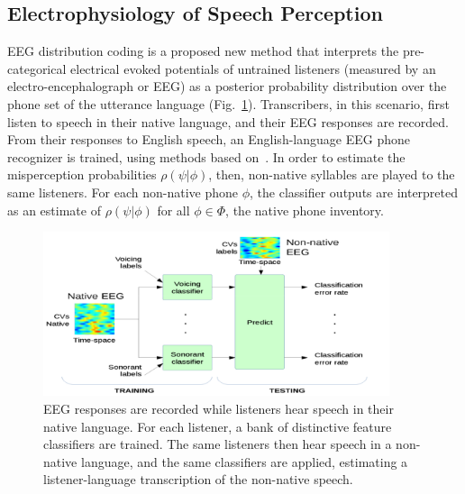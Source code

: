 \subsection{Electrophysiology of Speech Perception}
  
EEG distribution coding is a proposed new method that interprets the
pre-categorical electrical evoked potentials of untrained listeners
(measured by an electro-encephalograph or EEG) as a posterior
probability distribution over the phone set of the utterance language
(Fig.~\ref{fig:eeg_paradigm}).  Transcribers, in this scenario, first
listen to speech in their native language, and their EEG responses are
recorded.  From their responses to English speech, an English-language
EEG phone recognizer is trained, using methods based
on~\cite{Liberto15}.  In order to estimate the misperception
probabilities $\rho(\psi|\phi)$, then, non-native syllables are played
to the same listeners.  For each non-native phone $\phi$, the
classifier outputs are interpreted as an estimate of $\rho(\psi|\phi)$
for all $\phi\in\mathbb{\Phi}$, the native phone inventory.

\begin{figure}
  \centerline{\includegraphics[width=4in]{../figs/diliberto_paradigm.png}}
  \caption{EEG responses are recorded while listeners hear speech in
    their native language.  For each listener, a bank of distinctive
    feature classifiers are trained.  The same listeners then hear
    speech in a non-native language, and the same classifiers are
    applied, estimating a listener-language transcription of the
    non-native speech.}
  \label{fig:eeg_paradigm}
\end{figure}

